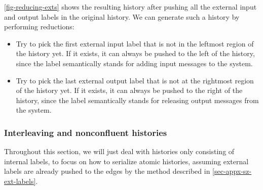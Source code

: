 \documentclass[sigplan,10pt,review,anonymous,screen]{acmart}\settopmatter{printfolios=true,printccs=false,printacmref=false}
\begin{document}
\autoref{fig-reducing-exts} shows the resulting history after pushing all the external input and output labels in the original history.
We can generate such a history by performing reductions:
\begin{itemize}
\item Try to pick the first external input label that is not in the leftmost region of the history yet. If it exists, it can always be pushed to the left of the history, since the label semantically stands for adding input messages to the system.
\item Try to pick the last external output label that is not at the rightmost region of the history yet. If it exists, it can always be pushed to the right of the history, since the label semantically stands for releasing output messages from the system.
\end{itemize}

\subsubsection{Interleaving and nonconfluent histories}

\newcommand{\hcont}[2]{\ensuremath{#1 \leadsto #2}}
\newcommand{\hextcont}[3]{\ensuremath{#1 \vdash #2 \leadsto_{\textsf{ext}} #3}}
\newcommand{\hdiscont}[2]{\ensuremath{#1 \not\leadsto #2}}
\newcommand{\hitlv}[2]{\ensuremath{\mathit{Interleaved}\ #1\ #2}}

Throughout this section, we will just deal with histories only consisting of internal labels, to focus on how to serialize atomic histories, assuming external labels are already pushed to the edges by the method described in \autoref{sec-appx-sz-ext-labels}.
\end{document}
